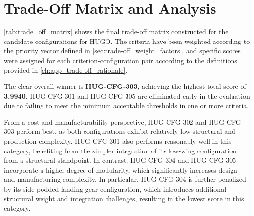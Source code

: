\section{Trade-Off Matrix and Analysis}
\label{sec:trade-off_matrix}

\autoref{tab:trade_off_matrix} shows the final trade-off matrix constructed for the candidate configurations for HUGO. The criteria have been weighted according to the priority vector defined in \autoref{sec:trade-off_weight_factors}, and specific scores were assigned for each criterion-configuration pair according to the definitions provided in \autoref{ch:app_trade-off_rationale}. %

The clear overall winner is \textbf{HUG-CFG-303}, achieving the highest total score of \textbf{3.9940}. HUG-CFG-301 and HUG-CFG-305 are eliminated early in the evaluation due to failing to meet the minimum acceptable thresholds in one or more criteria.

From a cost and manufacturability perspective, HUG-CFG-302 and HUG-CFG-303 perform best, as both configurations exhibit relatively low structural and production complexity. HUG-CFG-301 also performs reasonably well in this category, benefiting from the simpler integration of its low-wing configuration from a structural standpoint. In contrast, HUG-CFG-304 and HUG-CFG-305 incorporate a higher degree of modularity, which significantly increases design and manufacturing complexity. In particular, HUG-CFG-304 is further penalized by its side-podded landing gear configuration, which introduces additional structural weight and integration challenges, resulting in the lowest score in this category.

